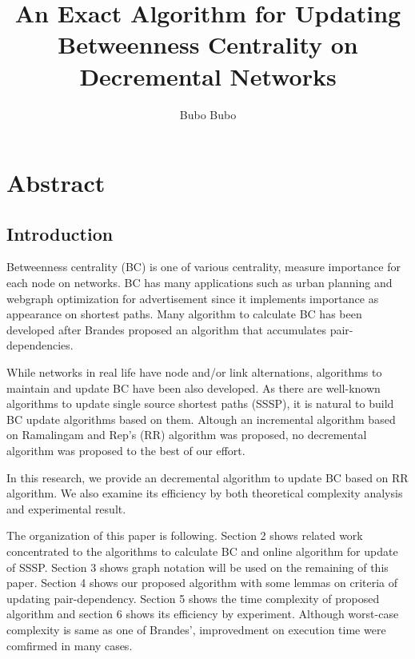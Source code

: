 \documentclass{article}
\title{An Exact Algorithm for Updating Betweenness Centrality on \\ Decremental Networks}
\author{Bubo Bubo}
\begin{document}
\maketitle
\section*{Abstract}

\begin{multicols*}{2}
  \section{Introduction}
  Betweenness centrality (BC)\cite{Freeman1977} is one of various centrality, measure importance for each node on networks.
  BC has many applications such as urban planning\cite{Crucitti2006} and webgraph optimization for advertisement\cite{Medya2018} since it implements importance as appearance on shortest paths.
  Many algorithm to calculate BC has been developed after Brandes\cite{Brandes2001} proposed an algorithm that accumulates pair-dependencies.

  While networks in real life have node and/or link alternations\cite{Holme2012}, algorithms to maintain and update BC have been also developed.
  As there are well-known algorithms to update single source shortest paths (SSSP), it is natural to build BC update algorithms based on them.
  Altough an incremental algorithm based on Ramalingam and Rep's (RR) algorithm\cite{Ramalingam1996} was proposed, no decremental algorithm was proposed to the best of our effort.

  In this research, we provide an decremental algorithm to update BC based on RR algorithm.
  We also examine its efficiency by both theoretical complexity analysis and experimental result.

  The organization of this paper is following.
  Section 2 shows related work concentrated to the algorithms to calculate BC and online algorithm for update of SSSP.
  Section 3 shows graph notation will be used on the remaining of this paper.
  Section 4 shows our proposed algorithm with some lemmas on criteria of updating pair-dependency.
  Section 5 shows the time complexity of proposed algorithm and section 6 shows its efficiency by experiment.
  Although worst-case complexity is same as one of Brandes', improvedment on execution time were comfirmed in many cases.


\end{multicols*}
\end{document}
